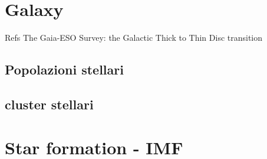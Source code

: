 \section{Galaxy}

\begin{frame}{Refs}
The Gaia-ESO Survey: the Galactic Thick to Thin Disc transition
\end{frame}

\subsection{Popolazioni stellari}

\subsection{cluster stellari}

\section{Star formation - IMF}

